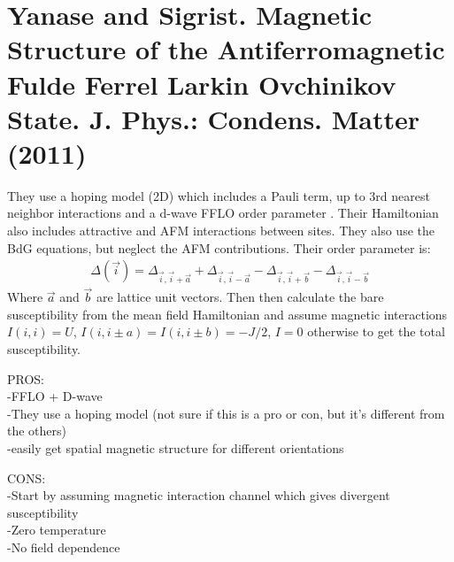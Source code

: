 \documentclass{article}
\begin{document}
\section{Yanase and Sigrist. Magnetic Structure of the Antiferromagnetic Fulde Ferrel Larkin Ovchinikov State. J. Phys.: Condens. Matter (2011)}
They use a hoping model (2D) which includes a Pauli term, up to 3rd nearest neighbor interactions and a d-wave FFLO order parameter . Their Hamiltonian also includes attractive and AFM interactions between sites. They also use the BdG equations, but neglect the AFM contributions. Their order parameter is:
\begin{align*}
\Delta(\vec i)=\Delta_{\vec i ,\vec i+\vec a}+\Delta_{\vec i ,\vec i-\vec a}-\Delta_{\vec i ,\vec i+\vec b}-\Delta_{\vec i ,\vec i- \vec b}
\end{align*}
Where $\vec a$ and $\vec b$ are lattice unit vectors. Then then calculate the bare susceptibility from the mean field Hamiltonian and assume magnetic interactions $I(i,i)=U$, $I(i,i\pm a)=I(i,i\pm b)=-J/2$, $I=0$ otherwise to get the total susceptibility.

PROS:\\
-FFLO + D-wave\\
-They use a hoping model (not sure if this is a pro or con, but it's different from the others)\\
-easily get spatial magnetic structure for different orientations 

CONS: \\
-Start by assuming magnetic interaction channel which gives divergent susceptibility \\
-Zero temperature \\
-No field dependence \\
\end{document}
